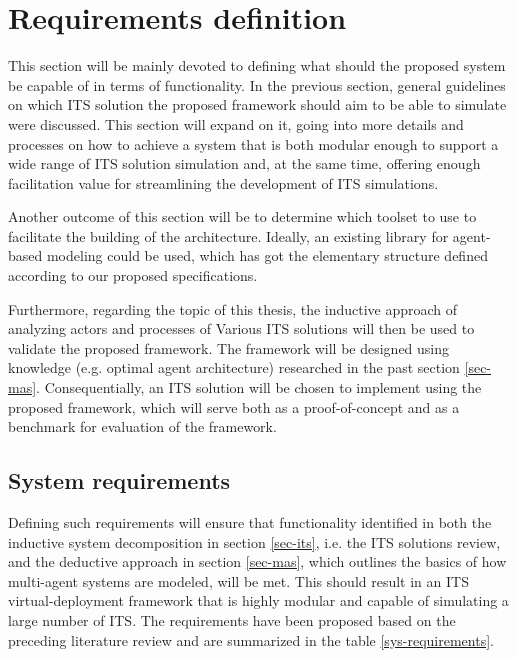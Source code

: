 \documentclass[0main.tex]{subfiles}
\begin{document}
\section{Requirements definition}\label{sec-requirements}

This section will be mainly devoted to defining what should the proposed system be capable of in terms 
of functionality. In the previous section, general guidelines on which ITS solution the proposed 
framework should aim to be able to simulate were discussed. This section will expand on it, 
going into more details and processes on how to achieve a system that is both modular enough to support 
a wide range of ITS solution simulation and, at the same time, offering enough facilitation value 
for streamlining the development of ITS simulations. 

Another outcome of this section will be to determine which toolset to use to facilitate the building of 
the architecture. Ideally, an existing library for agent-based modeling could be used, which has got 
the elementary structure defined according to our proposed specifications.

Furthermore, regarding the topic of this thesis, the inductive approach of analyzing actors and
processes of Various ITS solutions will then be used to validate the proposed framework. The
framework will be designed using knowledge (e.g. optimal agent architecture) researched in the
past section \ref{sec-mas}. Consequentially, an ITS solution will be chosen to implement
using the proposed framework, which will serve both as a proof-of-concept and as a benchmark
for evaluation of the framework.  

\subsection{System requirements}

Defining such requirements will ensure that functionality identified in both the inductive
system decomposition in section \ref{sec-its}, i.e. the ITS solutions review, and the deductive
approach in section \ref{sec-mas}, which outlines the basics of how multi-agent systems are
modeled, will be met. This should result in an ITS virtual-deployment framework that is highly
modular and capable of simulating a large number of ITS. The requirements have been proposed based 
on the preceding literature review and are summarized in the table \ref{sys-requirements}.
\end{document}
